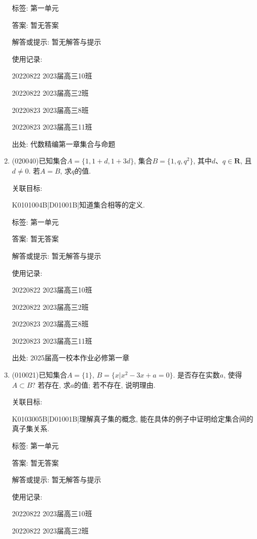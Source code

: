 \documentclass[10pt,a4paper]{article}
\begin{document}
\begin{enumerate}[1.]
标签: 第一单元

答案: 暂无答案

解答或提示: 暂无解答与提示

使用记录:

20220822	2023届高三10班	

20220822	2023届高三2班	

20220823	2023届高三8班	

20220823	2023届高三11班	


出处: 代数精编第一章集合与命题
\item { (020040)}已知集合$A=\{1, 1+d, 1+3d\}$, 集合$B=\{1, q, q^2\}$, 其中$d$、$q\in \mathbf{R}$, 且$d\ne 0$. 若$A=B$, 求$q$的值.


关联目标:

K0101004B|D01001B|知道集合相等的定义.



标签: 第一单元

答案: 暂无答案

解答或提示: 暂无解答与提示

使用记录:

20220822	2023届高三10班	

20220822	2023届高三2班	

20220823	2023届高三8班	

20220823	2023届高三11班	


出处: 2025届高一校本作业必修第一章
\item { (010021)}已知集合$A=\{1\}$, $B=\{x|x^2-3x+a=0\}$. 是否存在实数$a$, 使得$A\subset B$?  若存在, 求$a$的值; 若不存在, 说明理由.


关联目标:

K0103005B|D01001B|理解真子集的概念, 能在具体的例子中证明给定集合间的真子集关系.



标签: 第一单元

答案: 暂无答案

解答或提示: 暂无解答与提示

使用记录:

20220822	2023届高三10班	

20220822	2023届高三2班	


\end{enumerate}
\end{document}
